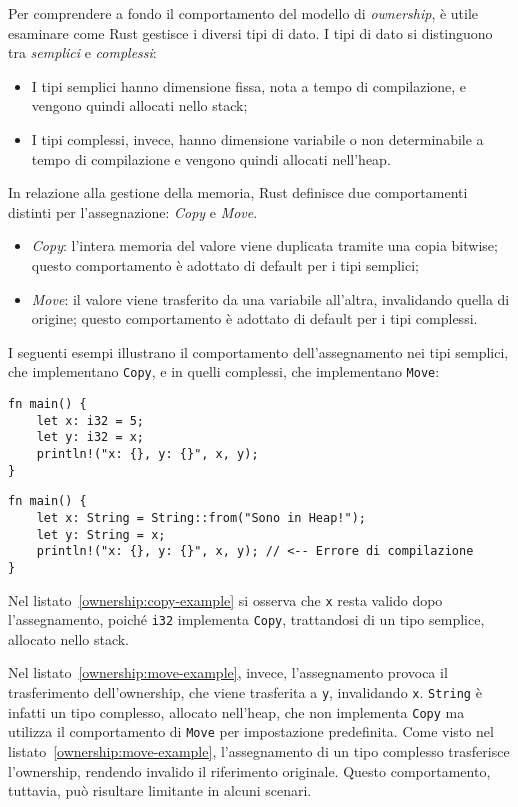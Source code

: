 Per comprendere a fondo il comportamento del modello di \textit{ownership}, è utile esaminare come Rust gestisce i diversi tipi di dato. I tipi di dato si distinguono tra \textit{semplici} e \textit{complessi}:
\begin{itemize}
    \item I tipi semplici hanno dimensione fissa, nota a tempo di compilazione, e vengono quindi allocati nello stack;
    \item I tipi complessi, invece, hanno dimensione variabile o non determinabile a tempo di compilazione e vengono quindi allocati nell'heap.
\end{itemize}
In relazione alla gestione della memoria, Rust definisce due comportamenti distinti per l'assegnazione: \textit{Copy} e \textit{Move}.
\begin{itemize}
    \item \textit{Copy}: l'intera memoria del valore viene duplicata tramite una copia bitwise; questo comportamento è adottato di default per i tipi semplici;
    \item \textit{Move}: il valore viene trasferito da una variabile all'altra, invalidando quella di origine; questo comportamento è adottato di default per i tipi complessi.
\end{itemize}

\noindent I seguenti esempi illustrano il comportamento dell'assegnamento nei tipi semplici, che implementano \texttt{Copy}, e in quelli complessi, che implementano \texttt{Move}:
\begin{lstlisting}[style=ruststyle, caption={Comportamento di Copy}, label={ownership:copy-example}]
fn main() {
    let x: i32 = 5;
    let y: i32 = x;
    println!("x: {}, y: {}", x, y);
}
\end{lstlisting}
\begin{lstlisting}[style=ruststyle, caption={Comportamento di Move}, label={ownership:move-example}]
fn main() {
    let x: String = String::from("Sono in Heap!");
    let y: String = x;
    println!("x: {}, y: {}", x, y); // <-- Errore di compilazione
}
\end{lstlisting}
Nel listato~\ref{ownership:copy-example} si osserva che \texttt{x} resta valido dopo l'assegnamento, poiché \texttt{i32} implementa \texttt{Copy}, trattandosi di un tipo semplice, allocato nello stack.

Nel listato~\ref{ownership:move-example}, invece, l'assegnamento provoca il trasferimento dell'ownership, che viene trasferita a \texttt{y}, invalidando \texttt{x}. \texttt{String} è infatti un tipo complesso, allocato nell'heap, che non implementa \texttt{Copy} ma utilizza il comportamento di \texttt{Move} per impostazione predefinita. \hfill
\break\break
\noindent Come visto nel listato~\ref{ownership:move-example}, l'assegnamento di un tipo complesso trasferisce l'ownership, rendendo invalido il riferimento originale. Questo comportamento, tuttavia, può risultare limitante in alcuni scenari.

